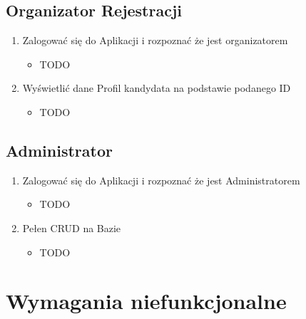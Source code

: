 \documentclass{article}
\begin{document}
\subsection{Organizator Rejestracji}
\begin{enumerate}
  \item Zalogować się do Aplikacji i rozpoznać że jest organizatorem
      \begin{itemize}
         \item TODO
       \end{itemize}
  \item Wyświetlić dane Profil kandydata na podstawie podanego ID
      \begin{itemize}
         \item TODO
       \end{itemize}
\end{enumerate}

\subsection{Administrator}
\begin{enumerate}
  \item Zalogować się do Aplikacji i rozpoznać że jest Administratorem
      \begin{itemize}
         \item TODO
       \end{itemize}
  \item Pełen CRUD na Bazie
      \begin{itemize}
         \item TODO
       \end{itemize}
\end{enumerate}

\section{Wymagania niefunkcjonalne}
\end{document}
